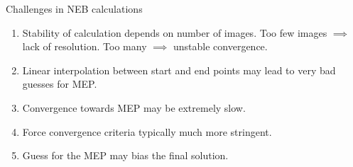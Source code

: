 \documentclass[aspectratio=169]{beamer}
\begin{document}
    \begin{frame}{Challenges in NEB calculations}
        \begin{enumerate}
            \item Stability of calculation depends on number of images. Too few images $\implies$ lack of resolution. Too many $\implies$ unstable convergence.
            \item Linear interpolation between start and end points may lead to very bad guesses for MEP.
            \item Convergence towards MEP may be extremely slow.
            \item Force convergence criteria typically much more stringent.
            \item Guess for the MEP may bias the final solution.
        \end{enumerate}
    \end{frame}
\end{document}
